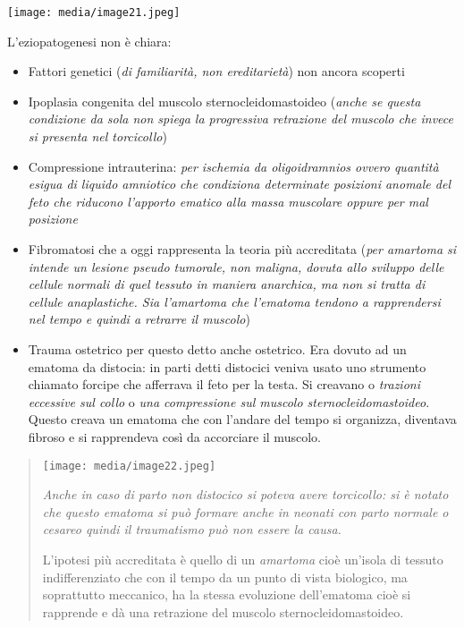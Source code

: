 \documentclass[]{article}
\begin{document}
\texttt{[image: media/image21.jpeg]}

L'eziopatogenesi non è chiara:

\begin{itemize}
\item
  Fattori genetici (\emph{di familiarità, non ereditarietà}) non ancora
  scoperti
\item
  Ipoplasia congenita del muscolo sternocleidomastoideo (\emph{anche se
  questa condizione da sola non spiega la progressiva retrazione del
  muscolo che invece si presenta nel torcicollo})
\item
  Compressione intrauterina: \emph{per \emph{ischemia da oligoidramnios}
  ovvero quantità esigua di liquido amniotico che condiziona determinate
  posizioni anomale del feto che riducono l'apporto ematico alla massa
  muscolare oppure \emph{per mal posizione}}
\item
  Fibromatosi che a oggi rappresenta la teoria più accreditata
  (\emph{per amartoma si intende un lesione pseudo tumorale, non
  maligna, dovuta allo sviluppo delle cellule normali di quel tessuto in
  maniera anarchica, ma non si tratta di cellule anaplastiche. Sia
  l'amartoma che l'ematoma tendono a rapprendersi nel tempo e quindi a
  retrarre il muscolo})
\item
  Trauma ostetrico per questo detto anche ostetrico. Era dovuto ad un
  ematoma da distocia: in parti detti distocici veniva usato uno
  strumento chiamato forcipe che afferrava il feto per la testa. Si
  creavano o \emph{trazioni eccessive sul collo} o \emph{una
  compressione sul muscolo sternocleidomastoideo}. Questo creava un
  ematoma che con l'andare del tempo si organizza, diventava fibroso e
  si rapprendeva così da accorciare il muscolo.
\end{itemize}

\begin{quote}
\texttt{[image: media/image22.jpeg]}

\emph{Anche in caso di parto non distocico si poteva avere torcicollo:
si è notato che questo ematoma si può formare anche in neonati con parto
normale o cesareo quindi il traumatismo può non essere la causa.}

L'ipotesi più accreditata è quello di un \emph{amartoma} cioè un'isola
di tessuto indifferenziato che con il tempo da un punto di vista
biologico, ma soprattutto meccanico, ha la stessa evoluzione
dell'ematoma cioè si rapprende e dà una retrazione del muscolo
sternocleidomastoideo.
\end{quote}
\end{document}
